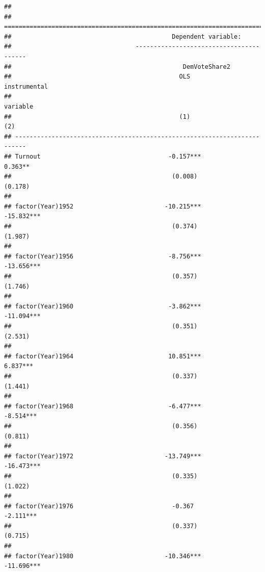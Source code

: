 \documentclass[]{book}
\begin{document}
\begin{verbatim}
## 
## =========================================================================
##                                            Dependent variable:           
##                                  ----------------------------------------
##                                               DemVoteShare2              
##                                              OLS             instrumental
##                                                                variable  
##                                              (1)                 (2)     
## -------------------------------------------------------------------------
## Turnout                                   -0.157***            0.363**   
##                                            (0.008)             (0.178)   
##                                                                          
## factor(Year)1952                         -10.215***           -15.832*** 
##                                            (0.374)             (1.987)   
##                                                                          
## factor(Year)1956                          -8.756***           -13.656*** 
##                                            (0.357)             (1.746)   
##                                                                          
## factor(Year)1960                          -3.862***           -11.094*** 
##                                            (0.351)             (2.531)   
##                                                                          
## factor(Year)1964                          10.851***            6.837***  
##                                            (0.337)             (1.441)   
##                                                                          
## factor(Year)1968                          -6.477***           -8.514***  
##                                            (0.356)             (0.811)   
##                                                                          
## factor(Year)1972                         -13.749***           -16.473*** 
##                                            (0.335)             (1.022)   
##                                                                          
## factor(Year)1976                           -0.367             -2.111***  
##                                            (0.337)             (0.715)   
##                                                                          
## factor(Year)1980                         -10.346***           -11.696*** 

\end{verbatim}
\end{document}
